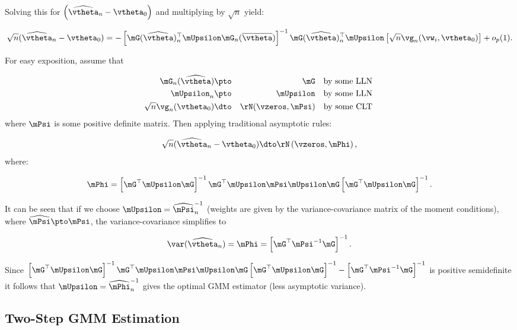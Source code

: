 \documentclass[english,12pt]{book}\usepackage[]{graphicx}\usepackage[]{xcolor}
\begin{document}
Solving this for $\left(\widehat{\vtheta}_n - \vtheta_0\right)$ and multiplying by $\sqrt{n}$ yield:

\begin{equation*}
\sqrt{n}(\widehat{\vtheta}_n - \vtheta_0) = - \left[\mG(\widehat{\vtheta})_n^\top\mUpsilon\mG_n(\overline{\vtheta})\right]^{-1}\mG(\widehat{\vtheta})^\top_n\mUpsilon\left[\sqrt{n}\vg_n(\vw_i, \vtheta_0)\right] + o_p(1).
\end{equation*}

For easy exposition, assume that 

\begin{eqnarray}
 \mG_n(\widehat{\vtheta})& \pto & \mG \quad \mbox{by some LLN }\\
 \mUpsilon_n &\pto & \mUpsilon\quad \mbox{by some LLN } \\
 \sqrt{n}\vg_n(\vtheta_0)& \dto & \rN(\vzeros, \mPsi) \quad \mbox{by some CLT } \label{eq:asymptotic_distr_moment}
\end{eqnarray}
%
where $\mPsi$ is some positive definite matrix. Then applying traditional asymptotic rules:

\begin{equation*}
\sqrt{n}(\widehat{\vtheta}_n - \vtheta_0)\dto \rN\left(\vzeros, \mPhi\right),
\end{equation*}
%
where:

\begin{equation*}
\mPhi = \left[\mG^\top\mUpsilon\mG\right]^{-1}\mG^\top\mUpsilon\mPsi\mUpsilon\mG\left[\mG^\top\mUpsilon\mG\right]^{-1}. 
\end{equation*}

It can be seen that if we choose $\mUpsilon = \widehat{\mPsi}^{-1}_n$ (weights are given by the variance-covariance matrix of the moment conditions), where $\widehat{\mPsi}\pto \mPsi$, the variance-covariance simplifies to

\begin{equation*}
\var(\widehat{\vtheta}_n) = \mPhi = \left[\mG^\top\mPsi^{-1}\mG\right]^{-1}.
\end{equation*}

Since $\left[\mG^\top\mUpsilon\mG\right]^{-1}\mG^\top\mUpsilon\mPsi\mUpsilon\mG\left[\mG^\top\mUpsilon\mG\right]^{-1} - \left[\mG^\top\mPsi^{-1}\mG\right]^{-1}$ is positive semidefinite it follows that $\mUpsilon = \widehat{\mPhi}^{-1}_n$ gives the optimal GMM estimator (less asymptotic variance).

\subsection{Two-Step GMM Estimation}\label{section:2step-gmm}
\end{document}
